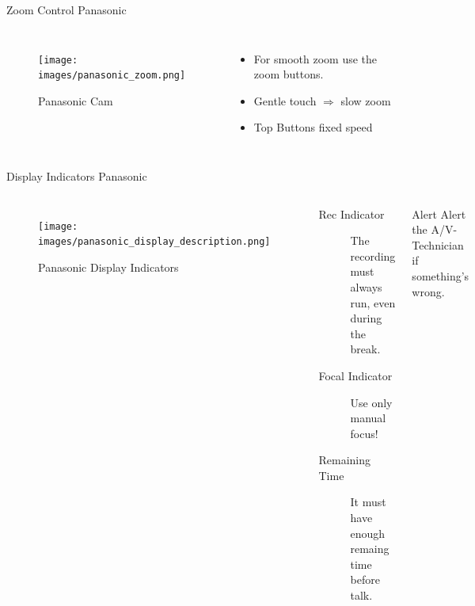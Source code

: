 \documentclass[aspectratio=169]{beamer}
\begin{document}
\begin{frame}{Zoom Control Panasonic}
	\begin{columns}[T,onlytextwidth]
	\begin{figure} 
		\centering
		\texttt{[image: images/panasonic\_zoom.png]}
		\caption{Panasonic Cam}
	\end{figure}
		\begin{itemize}
			\item For smooth zoom use the zoom buttons.
			\item Gentle touch $\Rightarrow$ slow zoom
			\item Top Buttons fixed speed
		\end{itemize}
	\end{columns}
\end{frame}



\begin{frame}{Display Indicators Panasonic}
	\begin{columns}[T,onlytextwidth]
	\begin{figure} 
		\centering
		\texttt{[image: images/panasonic\_display\_description.png]}
		\caption{Panasonic Display Indicators}
	\end{figure}
		\begin{description}
			\item[Rec Indicator] The recording must always run, even during the break.
			\item[Focal Indicator] Use only manual focus!
			\item[Remaining Time] It must have enough remaing time before talk.
		\end{description}
		\begin{alertblock}{Alert}
			Alert the A/V-Technician if something's wrong.
		\end{alertblock}
	\end{columns}
\end{frame}
\end{document}
